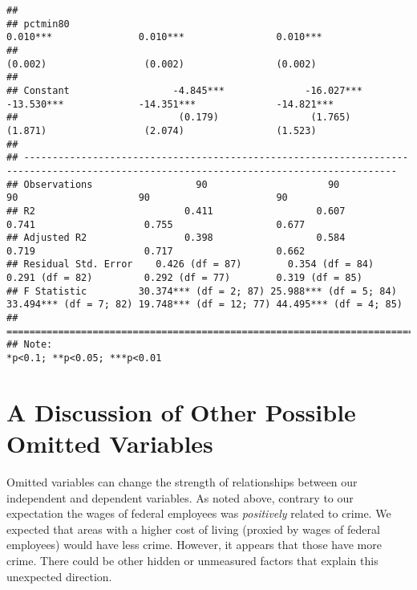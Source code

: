 \documentclass[]{article}
\begin{document}
\begin{verbatim}
##                                                                                                                                        
## pctmin80                                                                 0.010***               0.010***                0.010***       
##                                                                          (0.002)                 (0.002)                (0.002)        
##                                                                                                                                        
## Constant                  -4.845***              -16.027***             -13.530***             -14.351***              -14.821***      
##                            (0.179)                (1.765)                (1.871)                 (2.074)                (1.523)        
##                                                                                                                                        
## ---------------------------------------------------------------------------------------------------------------------------------------
## Observations                  90                     90                     90                     90                      90          
## R2                          0.411                  0.607                  0.741                   0.755                  0.677         
## Adjusted R2                 0.398                  0.584                  0.719                   0.717                  0.662         
## Residual Std. Error    0.426 (df = 87)        0.354 (df = 84)        0.291 (df = 82)         0.292 (df = 77)        0.319 (df = 85)    
## F Statistic         30.374*** (df = 2; 87) 25.988*** (df = 5; 84) 33.494*** (df = 7; 82) 19.748*** (df = 12; 77) 44.495*** (df = 4; 85)
## =======================================================================================================================================
## Note:                                                                                                       *p<0.1; **p<0.05; ***p<0.01
\end{verbatim}

\hypertarget{a-discussion-of-other-possible-omitted-variables}{%
\section{A Discussion of Other Possible Omitted
Variables}\label{a-discussion-of-other-possible-omitted-variables}}

Omitted variables can change the strength of relationships between our
independent and dependent variables. As noted above, contrary to our
expectation the wages of federal employees was \emph{positively} related
to crime. We expected that areas with a higher cost of living (proxied
by wages of federal employees) would have less crime. However, it
appears that those have more crime. There could be other hidden or
unmeasured factors that explain this unexpected direction.
\end{document}

